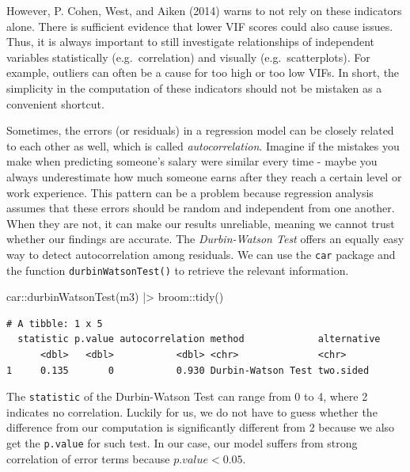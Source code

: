 \documentclass[
  letterpaper,
]{krantz}
\makeatletter
\newenvironment{Shaded}{\begin{snugshade}}{\end{snugshade}}
\newcommand{\FunctionTok}[1]{\textcolor[rgb]{0.28,0.35,0.67}{#1}}
\newcommand{\NormalTok}[1]{\textcolor[rgb]{0.00,0.23,0.31}{#1}}
\newcommand{\SpecialCharTok}[1]{\textcolor[rgb]{0.37,0.37,0.37}{#1}}
\newenvironment{kframe}{%
\medskip{}
\setlength{\fboxsep}{.8em}
 \def\at@end@of@kframe{}%
 \ifinner\ifhmode%
  \def\at@end@of@kframe{\end{minipage}}%
  \begin{minipage}{\columnwidth}%
 \fi\fi%
 \def\FrameCommand##1{\hskip\@totalleftmargin \hskip-\fboxsep
 \colorbox{shadecolor}{##1}\hskip-\fboxsep
     \hskip-\linewidth \hskip-\@totalleftmargin \hskip\columnwidth}%
 \MakeFramed {\advance\hsize-\width
   \@totalleftmargin\z@ \linewidth\hsize
   \@setminipage}}%
 {\par\unskip\endMakeFramed%
 \at@end@of@kframe}
\renewenvironment{Shaded}{\begin{kframe}}{\end{kframe}}
\makeatother
\begin{document}
However, P. Cohen, West, and Aiken (2014) warns to not rely on these
indicators alone. There is sufficient evidence that lower VIF scores
could also cause issues. Thus, it is always important to still
investigate relationships of independent variables statistically
(e.g.~correlation) and visually (e.g.~scatterplots). For example,
outliers can often be a cause for too high or too low VIFs. In short,
the simplicity in the computation of these indicators should not be
mistaken as a convenient shortcut.

Sometimes, the errors (or residuals) in a regression model can be
closely related to each other as well, which is called
\emph{autocorrelation}. Imagine if the mistakes you make when predicting
someone's salary were similar every time - maybe you always
underestimate how much someone earns after they reach a certain level or
work experience. This pattern can be a problem because regression
analysis assumes that these errors should be random and independent from
one another. When they are not, it can make our results unreliable,
meaning we cannot trust whether our findings are accurate. The
\emph{Durbin-Watson Test} offers an equally easy way to detect
autocorrelation among residuals. We can use the \texttt{car} package and
the function \texttt{durbinWatsonTest()} to retrieve the relevant
information.

\begin{Shaded}
\begin{Highlighting}[]
\NormalTok{car}\SpecialCharTok{::}\FunctionTok{durbinWatsonTest}\NormalTok{(m3) }\SpecialCharTok{|\textgreater{}}
\NormalTok{  broom}\SpecialCharTok{::}\FunctionTok{tidy}\NormalTok{()}
\end{Highlighting}
\end{Shaded}

\begin{verbatim}
# A tibble: 1 x 5
  statistic p.value autocorrelation method             alternative
      <dbl>   <dbl>           <dbl> <chr>              <chr>      
1     0.135       0           0.930 Durbin-Watson Test two.sided  
\end{verbatim}

The \texttt{statistic} of the Durbin-Watson Test can range from 0 to 4,
where 2 indicates no correlation. Luckily for us, we do not have to
guess whether the difference from our computation is significantly
different from 2 because we also get the \texttt{p.value} for such test.
In our case, our model suffers from strong correlation of error terms
because \(p.value < 0.05\).
\end{document}
